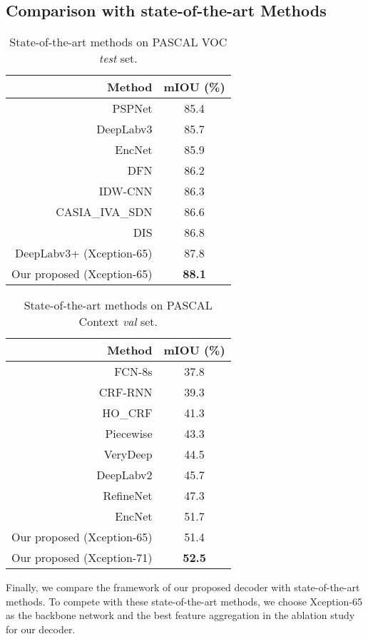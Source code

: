 \documentclass[10pt,twocolumn,letterpaper]{article}
\newcommand{\1}{{\mathbbm{1}}}
\begin{document}
\subsection{Comparison with state-of-the-art Methods}
\begin{table}
\begin{center}
\small
\begin{tabular}{ r |c}
\hline
Method & mIOU (\%) \\
\hline\hline
PSPNet \cite{zhao2017pyramid} & 85.4 \\
DeepLabv3 \cite{chen2017rethinking} & 85.7 \\
EncNet \cite{zhang2018context} & 85.9 \\
DFN \cite{yu2018learning} & 86.2 \\
IDW-CNN \cite{wang2017learning} & 86.3 \\
CASIA\_IVA\_SDN \cite{fu2017stacked} & 86.6 \\
DIS \cite{luo2017deep} & 86.8 \\
\hline
DeepLabv3+ \cite{chen2018encoder} (Xception-65) & 87.8 \\
Our proposed (Xception-65) & \textbf{88.1} \\
\hline
\end{tabular}
\end{center}
\caption{State-of-the-art methods on PASCAL VOC {\it test} set.}
\label{table:state_of_the_art_methods}
\end{table}
\begin{table}
\begin{center}
\small
\begin{tabular}{ r |c}
\hline
Method & mIOU (\%) \\
\hline\hline
FCN-8s \cite{long2015fully} & 37.8 \\
CRF-RNN \cite{zheng2015conditional} & 39.3 \\
HO\_CRF \cite{arnab2016higher} & 41.3 \\
Piecewise \cite{lin2016efficient} & 43.3 \\
VeryDeep \cite{wu2016bridging} & 44.5 \\
DeepLabv2 \cite{chen2018deeplab} & 45.7 \\
RefineNet \cite{lin2017refinenet} & 47.3 \\
EncNet \cite{zhang2018context} & 51.7 \\
\hline
Our proposed (Xception-65) & 51.4 \\
Our proposed (Xception-71) & \textbf{52.5} \\
\hline
\end{tabular}
\end{center}
\caption{State-of-the-art methods on PASCAL Context {\it val} set.}
\label{table:state_of_the_art_methods_on_pascal_context}
\end{table}
Finally, we compare the framework of our proposed decoder with state-of-the-art methods. To compete with these state-of-the-art methods, we choose Xception-65 as the backbone network and the best feature aggregation in the ablation study for our decoder.
\end{document}
